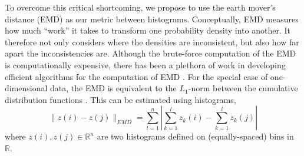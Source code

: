 \documentclass[prl, reprint, final, showkeys]{revtex4-1}
\begin{document}
To overcome this critical shortcoming, we propose to use the earth mover's distance (EMD) \cite{rubner2000earth} as our metric between histograms.
%
Conceptually, EMD measures how much ``work'' it takes to transform one probability density into another.
%
It therefore not only considers where the densities are inconsistent, but also how far apart the inconsistencies are.
%
Although the brute-force computation of the EMD is computationally expensive, there has been a plethora of work in developing efficient algorithms for the computation of EMD \cite{Pele-eccv2008, Pele-iccv2009}.
%
%
%
For the special case of one-dimensional data, the EMD is equivalent to the $L_1$-norm between the cumulative distribution functions \cite{rubner2000perceptual}.
%
This can be estimated using histograms, 
\begin{equation}
\| z(i) - z(j) \|_{EMD} = \sum_{l=1}^{n} \left| \sum_{k=1}^l z_k(i) - \sum_{k=1}^l z_k(j) \right|
\end{equation}
where $z(i), z(j) \in \mathbb{R}^n$ are two histograms defined on (equally-spaced) bins in $\mathbb{R}$. 

\end{document}
